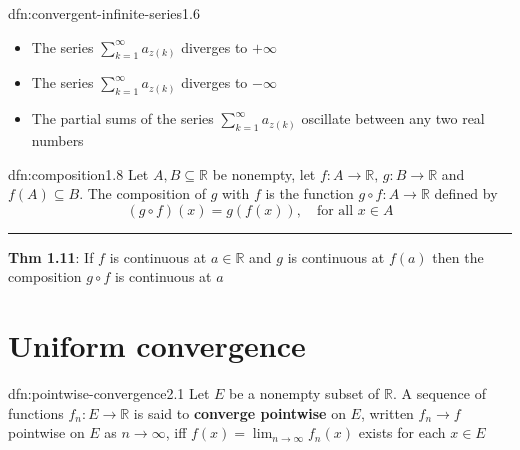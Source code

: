 \documentclass[landscape, 8pt]{extarticle}
\begin{document}
\begin{multicols}{3}
\begin{dfn}{dfn:convergent-infinite-series}{1.6}
\begin{itemize}[leftmargin=*]
		\item The series $\sum_{k=1}^{\infty} a_{z(k)}$ diverges to $+\infty$

		\item The series $\sum_{k=1}^{\infty} a_{z(k)}$ diverges to $-\infty$

		\item The partial sums of the series $\sum_{k=1}^{\infty} a_{z(k)}$ oscillate between any two real numbers

	\end{itemize}

\end{dfn}



%

\vspace{-5pt}
\begin{dfn}[Composition]{dfn:composition}{1.8}
	Let $A, B \subseteq \mathbb{R}$ be nonempty, let $f : A \to \mathbb{R},\, g : B \to \mathbb{R}$ and $f(A) \subseteq B$. The composition of $g$ with $f$ is the function $g \circ f : A \to \mathbb{R}$ defined by
	\[(g \circ f)(x) = g(f(x)), \quad \text{for all $x\in A$}\]

	\vspace{-5pt}
	\noindent\rule{\textwidth}{0.2pt}

	\textbf{Thm 1.11}: If $f$ is continuous at $a\in \mathbb{R}$ and $g$ is continuous at $f(a)$ then the composition $g \circ f$ is continuous at $a$
\end{dfn}

\newpage
\vspace{-15pt}
\section{Uniform convergence}

\begin{dfn}{dfn:pointwise-convergence}{2.1}
	Let $E$ be a nonempty subset of $\mathbb{R}$. A sequence of functions $f_{n}: E\to \mathbb{R}$ is said to \textbf{converge pointwise} on $E$, written $f_{n}\to f$ pointwise on $E$ as $n\to \infty$, iff $f(x) = \displaystyle\lim_{n \to \infty}f_{n}(x)$ exists for each $x \in E$


\end{dfn}
\end{multicols}
\end{document}
